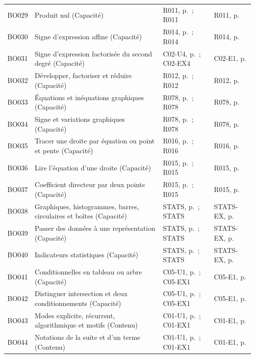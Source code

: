 \begin{longtable}{p{.1\linewidth}p{.43\linewidth}p{.19\linewidth}p{.16\linewidth}}
BO029 & Produit nul (Capacité) & R011, p.\,\pageref{R011} ; R011 & R011, p.\,\pageref{R011} \\
BO030 & Signe d’expression affine (Capacité) & R014, p.\,\pageref{R014} ; R014 & R014, p.\,\pageref{R014} \\
BO031 & Signe d’expression factorisée du second degré (Capacité) & C02-U4, p.\,\pageref{C02-U4} ; C02-EX4 & C02-E1, p.\,\pageref{C02-E1} \\
BO032 & Développer, factoriser et réduire (Capacité) & R012, p.\,\pageref{R012} ; R012 & R012, p.\,\pageref{R012} \\
BO033 & Équations et inéquations graphiques (Capacité) & R078, p.\,\pageref{R078} ; R078 & R078, p.\,\pageref{R078} \\
BO034 & Signe et variations graphiques (Capacité) & R078, p.\,\pageref{R078} ; R078 & R078, p.\,\pageref{R078} \\
BO035 & Tracer une droite par équation ou point et pente (Capacité) & R016, p.\,\pageref{R016} ; R016 & R016, p.\,\pageref{R016} \\
BO036 & Lire l’équation d’une droite (Capacité) & R015, p.\,\pageref{R015} ; R015 & R015, p.\,\pageref{R015} \\
BO037 & Coefficient directeur par deux points (Capacité) & R015, p.\,\pageref{R015} ; R015 & R015, p.\,\pageref{R015} \\
BO038 & Graphiques, histogrammes, barres, circulaires et boîtes (Capacité) & STATS, p.\,\pageref{STATS} ; STATS & STATS-EX, p.\,\pageref{STATS-EX} \\
BO039 & Passer des données à une représentation (Capacité) & STATS, p.\,\pageref{STATS} ; STATS & STATS-EX, p.\,\pageref{STATS-EX} \\
BO040 & Indicateurs statistiques (Capacité) & STATS, p.\,\pageref{STATS} ; STATS & STATS-EX, p.\,\pageref{STATS-EX} \\
BO041 & Conditionnelles en tableau ou arbre (Capacité) & C05-U1, p.\,\pageref{C05-U1} ; C05-EX1 & C05-E1, p.\,\pageref{C05-E1} \\
BO042 & Distinguer intersection et deux conditionnements (Capacité) & C05-U1, p.\,\pageref{C05-U1} ; C05-EX1 & C05-E1, p.\,\pageref{C05-E1} \\
BO043 & Modes explicite, récurrent, algorithmique et motifs (Contenu) & C01-U1, p.\,\pageref{C01-U1} ; C01-EX1 & C01-E1, p.\,\pageref{C01-E1} \\
BO044 & Notations de la suite et d’un terme (Contenu) & C01-U1, p.\,\pageref{C01-U1} ; C01-EX1 & C01-E1, p.\,\pageref{C01-E1} \\

\end{longtable}
